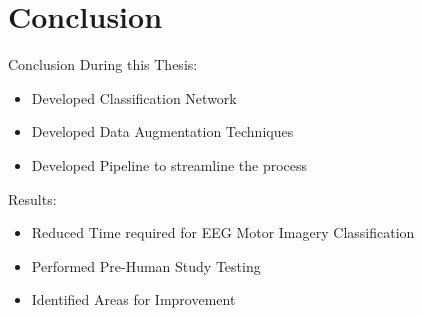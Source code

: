 \section{Conclusion}
\begin{frame}{Conclusion}
    During this Thesis:
    \begin{itemize}
        \item Developed Classification Network
        \item Developed Data Augmentation Techniques
        \item Developed Pipeline to streamline the process
    \end{itemize}
    Results:
    \begin{itemize}
        \item Reduced Time required for EEG Motor Imagery Classification
        \item Performed Pre-Human Study Testing
        \item Identified Areas for Improvement
    \end{itemize}
\end{frame}